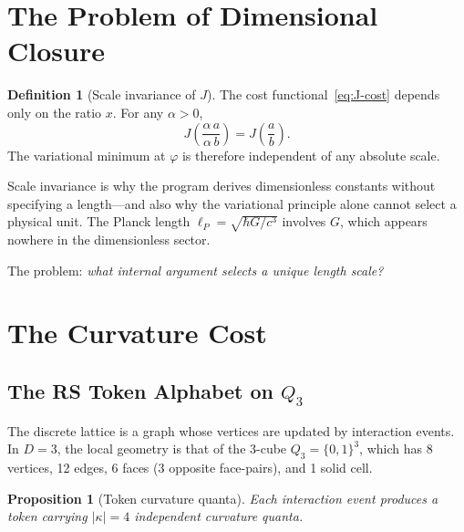 \documentclass[12pt]{article}
\newtheorem{proposition}[theorem]{Proposition}
\theoremstyle{definition}
\newtheorem{definition}[theorem]{Definition}
\theoremstyle{remark}
\begin{document}
\section{The Problem of Dimensional Closure}
\label{sec:problem}

\begin{definition}[Scale invariance of $J$]
\label{def:scale-inv}
The cost functional~\eqref{eq:J-cost} depends only on the ratio $x$.
For any $\alpha > 0$,
\begin{equation}
  J\!\left(\frac{\alpha\, a}{\alpha\, b}\right)
  = J\!\left(\frac{a}{b}\right).
\end{equation}
The variational minimum at $\varphi$ is therefore independent of any
absolute scale.
\end{definition}

Scale invariance is why the program derives dimensionless constants
without specifying a length---and also why the variational principle
alone cannot select a physical unit. The Planck length $\ell_P =
\sqrt{\hbar G/c^3}$ involves $G$, which appears nowhere in the
dimensionless sector.

The problem: \emph{what internal argument selects a unique length
scale?}

\section{The Curvature Cost}
\label{sec:curvature-cost}

\subsection{The RS Token Alphabet on $Q_3$}

The discrete lattice is a graph whose vertices are updated by
interaction events. In $D = 3$, the local geometry is that of the
3-cube $Q_3 =
\{0,1\}^3$, which has 8 vertices, 12 edges, 6 faces (3 opposite
face-pairs), and 1 solid cell.

\begin{proposition}[Token curvature quanta]
\label{prop:kappa}
Each interaction event produces a token carrying $|\kappa| = 4$
independent curvature quanta.
\end{proposition}
\end{document}
